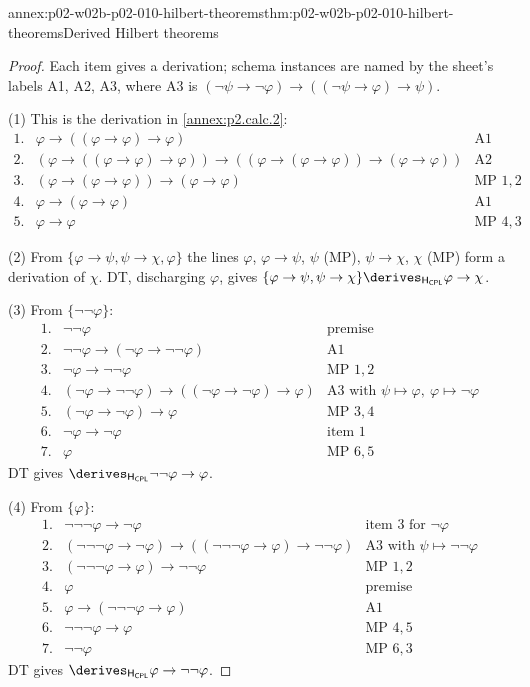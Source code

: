 \begin{annexitem}{annex:p02-w02b-p02-010-hilbert-theorems}{thm:p02-w02b-p02-010-hilbert-theorems}{Derived Hilbert theorems}
\begin{proof}
Each item gives a derivation; schema instances are named by the sheet's
labels A1, A2, A3, where A3 is
\((\neg\psi\to\neg\varphi)\to((\neg\psi\to\varphi)\to\psi)\).

(1) This is the derivation in \cref{annex:p2.calc.2}:
\[
\begin{array}{rll}
1.&\varphi\to((\varphi\to\varphi)\to\varphi)&\text{A1}\\
2.&(\varphi\to((\varphi\to\varphi)\to\varphi))\to
  ((\varphi\to(\varphi\to\varphi))\to(\varphi\to\varphi))&\text{A2}\\
3.&(\varphi\to(\varphi\to\varphi))\to(\varphi\to\varphi)&\text{MP }1,2\\
4.&\varphi\to(\varphi\to\varphi)&\text{A1}\\
5.&\varphi\to\varphi&\text{MP }4,3
\end{array}
\]

(2) From \(\{\varphi\to\psi,\psi\to\chi,\varphi\}\) the lines
\(\varphi\), \(\varphi\to\psi\), \(\psi\) (MP), \(\psi\to\chi\), \(\chi\) (MP)
form a derivation of \(\chi\).  DT, discharging \(\varphi\), gives
\(\{\varphi\to\psi,\psi\to\chi\}\derives_{\mathsf H_{\mathsf{CPL}}}\varphi\to\chi\).

(3) From \(\{\neg\neg\varphi\}\):
\[
\begin{array}{rll}
1.&\neg\neg\varphi&\text{premise}\\
2.&\neg\neg\varphi\to(\neg\varphi\to\neg\neg\varphi)&\text{A1}\\
3.&\neg\varphi\to\neg\neg\varphi&\text{MP }1,2\\
4.&(\neg\varphi\to\neg\neg\varphi)\to((\neg\varphi\to\neg\varphi)\to\varphi)
  &\text{A3 with }\psi\mapsto\varphi,\ \varphi\mapsto\neg\varphi\\
5.&(\neg\varphi\to\neg\varphi)\to\varphi&\text{MP }3,4\\
6.&\neg\varphi\to\neg\varphi&\text{item 1}\\
7.&\varphi&\text{MP }6,5
\end{array}
\]
DT gives \(\derives_{\mathsf H_{\mathsf{CPL}}}\neg\neg\varphi\to\varphi\).

(4) From \(\{\varphi\}\):
\[
\begin{array}{rll}
1.&\neg\neg\neg\varphi\to\neg\varphi&\text{item 3 for }\neg\varphi\\
2.&(\neg\neg\neg\varphi\to\neg\varphi)\to((\neg\neg\neg\varphi\to\varphi)\to\neg\neg\varphi)
  &\text{A3 with }\psi\mapsto\neg\neg\varphi\\
3.&(\neg\neg\neg\varphi\to\varphi)\to\neg\neg\varphi&\text{MP }1,2\\
4.&\varphi&\text{premise}\\
5.&\varphi\to(\neg\neg\neg\varphi\to\varphi)&\text{A1}\\
6.&\neg\neg\neg\varphi\to\varphi&\text{MP }4,5\\
7.&\neg\neg\varphi&\text{MP }6,3
\end{array}
\]
DT gives \(\derives_{\mathsf H_{\mathsf{CPL}}}\varphi\to\neg\neg\varphi\).


\end{proof}
\end{annexitem}
